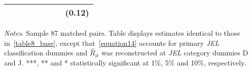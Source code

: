 \begin{table}[H]
\begin{threeparttable}
\begin{tabular}{p{3cm}S[table-format=3.3]@{}S[table-format=3.3]@{}S[table-format=3.2]@{}S[table-format=4.3]@{}S[table-format=3.3]@{}S[table-format=3.1]@{}S@{}}
                                          &            &            &            &            &            &            &      (0.12)   \\
            \bottomrule
        \end{tabular}
        \begin{tablenotes}
            \tiny
            \item \textit{Notes}. Sample 87 matched pairs. Table displays estimates identical to those in~\autoref{table8_base}, except that~\autoref{equation14} accounts for primary \textit{JEL} classification dummies and \(\widehat R_{it}\) was reconstructed at \textit{JEL} category dummies D and J. ***, ** and * statistically significant at 1\%, 5\% and 10\%, respectively.
        \end{tablenotes}
    \end{threeparttable}
\end{table}
